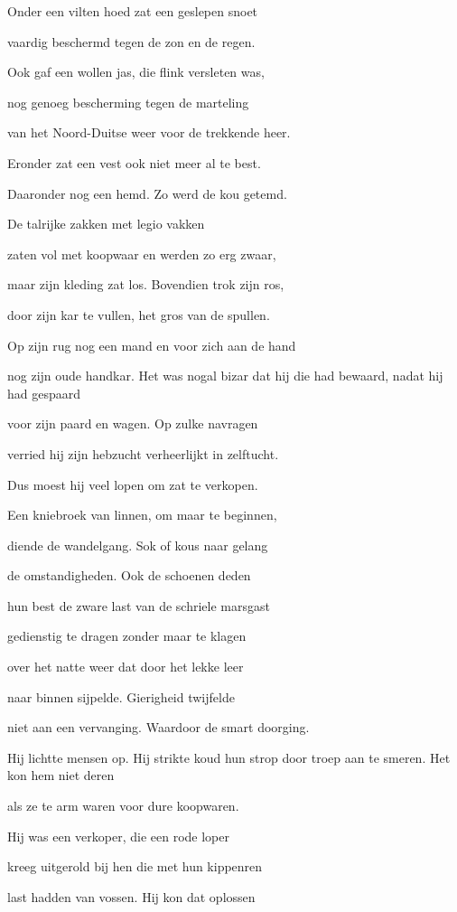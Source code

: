 Onder een vilten hoed
zat een geslepen snoet

vaardig beschermd tegen
de zon en de regen.

Ook gaf een wollen jas,
die flink versleten was,

nog genoeg bescherming
tegen de marteling

van het Noord-Duitse weer
voor de trekkende heer.

Eronder zat een vest
ook niet meer al te best.

Daaronder nog een hemd.
Zo werd de kou getemd.

De talrijke zakken
met legio vakken

zaten vol met koopwaar
en werden zo erg zwaar,

maar zijn kleding zat los.
Bovendien trok zijn ros,

door zijn kar te vullen,
het gros van de spullen.

Op zijn rug nog een mand
en voor zich aan de hand

nog zijn oude handkar.
Het was nogal bizar
dat hij die had bewaard,
nadat hij had gespaard

voor zijn paard en wagen.
Op zulke navragen

verried hij zijn hebzucht
verheerlijkt in zelftucht.

Dus moest hij veel lopen
om zat te verkopen.

Een kniebroek van linnen,
om maar te beginnen,

diende de wandelgang.
Sok of kous naar gelang

de omstandigheden.
Ook de schoenen deden

hun best de zware last
van de schriele marsgast

gedienstig te dragen
zonder maar te klagen

over het natte weer
dat door het lekke leer

naar binnen sijpelde.
Gierigheid twijfelde

niet aan een vervanging.
Waardoor de smart doorging.

Hij lichtte mensen op.
Hij strikte koud hun strop
door troep aan te smeren.
Het kon hem niet deren

als ze te arm waren
voor dure koopwaren.

Hij was een verkoper,
die een rode loper

kreeg uitgerold bij hen
die met hun kippenren

last hadden van vossen.
Hij kon dat oplossen

